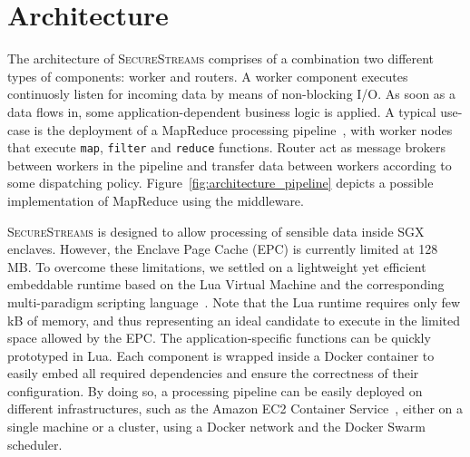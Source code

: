 \section{Architecture}
\label{sec:architecture}


The architecture of \textsc{SecureStreams} comprises of a combination two different types of components: worker and routers.
A worker component executes continuosly listen for incoming data by means of non-blocking I/O.
As soon as a data flows in, some application-dependent business logic is applied.
A typical use-case is the deployment of a MapReduce processing pipeline~\cite{Dean:2008:MSD:1327452.1327492}, with worker nodes that execute \texttt{map}, \texttt{filter} and \texttt{reduce} functions.
Router act as message brokers between workers in the pipeline and transfer data between workers according to some dispatching policy.
Figure~\ref{fig:architecture_pipeline} depicts a possible implementation of MapReduce using the \SYS middleware.

\textsc{SecureStreams} is designed to allow processing of sensible data inside SGX enclaves.
However, the Enclave Page Cache (EPC) is currently limited at 128 MB.
To overcome these limitations, we settled on a lightweight yet efficient embeddable runtime based on the Lua Virtual Machine\cite{ierusalimschy_luaextensible_1996} and the corresponding multi-paradigm scripting language~\cite{lualang}.
Note that the Lua runtime requires only few kB of memory, and thus representing an ideal candidate to execute in the limited space allowed by the EPC.
The application-specific functions can be quickly prototyped in Lua.
Each component is wrapped inside a Docker container to easily embed all required dependencies and ensure the correctness of their configuration.
By doing so, a processing pipeline can be easily deployed on different infrastructures, such as the Amazon EC2 Container Service~\cite{awsec2container}, either on a single machine or a cluster, using a Docker network and the Docker Swarm\cite{docker:swarm_2016} scheduler.

